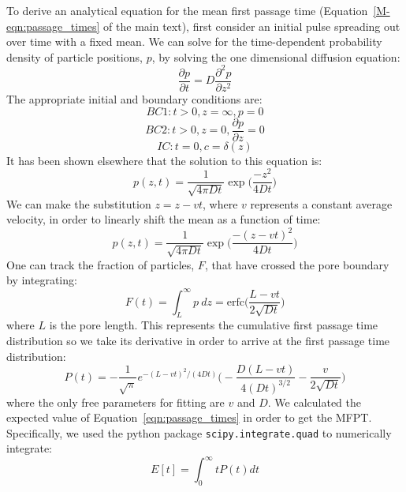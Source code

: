 \documentclass{article}
\begin{document}
  To derive an analytical equation for the mean first passage time 
  (Equation~\ref{M-eqn:passage_times} of the main text), first consider an 
  initial pulse spreading out over time with a fixed mean. We can solve for the 
  time-dependent probability density of particle positions, $p$, by solving the one
  dimensional diffusion equation:
  \begin{equation}
  \frac{\partial p}{\partial t} = D \frac{\partial^2 p}{\partial z^2}
  \end{equation}
  The appropriate initial and boundary conditions are:
  $$BC1: t > 0, z = \infty, p = 0$$
  $$BC2: t > 0, z = 0, \frac{\partial p}{\partial z} = 0$$
  $$IC: t = 0, c = \delta(z)$$ %
  It has been shown 
  elsewhere that the solution to this equation is:~\cite{cussler_diffusion:_2009}
  \begin{equation}
  p(z, t) = \frac{1}{\sqrt{4 \pi D t}}\exp\bigg(\frac{-z^2}{4Dt}\bigg)
  \end{equation}
  We can make the substitution $z = z - vt$, where $v$ represents a constant average
  velocity, in order to linearly shift the mean as a function of time:
  \begin{equation}
  p(z, t) = \frac{1}{\sqrt{4 \pi D t}}\exp\bigg(\frac{-(z - vt)^2}{4Dt}\bigg)
  \end{equation}
  One can track the fraction of particles, $F$, that have crossed the pore 
  boundary by integrating:
  \begin{equation}
  F(t) = \int_L^\infty p~dz = \mathrm{erfc}\bigg(\frac{L - vt}{2\sqrt{D t}}\bigg)
  \end{equation}
  where $L$ is the pore length. This represents the cumulative first passage 
  time distribution so we take its derivative in order to arrive at the first
  passage time distribution:
  \begin{equation}
  P(t) = -\frac{1}{\sqrt{\pi}}e^{-(L - vt)^2 / (4Dt)}\bigg(-\frac{D(L - vt)}{4(Dt)^{3/2}} - \frac{v}{2\sqrt{Dt}}\bigg)
  \label{eqn:passage_times}
  \end{equation} 
  where the only free parameters for fitting are $v$ and $D$. We calculated the
  expected value of Equation~\ref{eqn:passage_times} in order to get the MFPT. Specifically,
  we used the python package \texttt{scipy.integrate.quad} to numerically integrate:
  \begin{equation}
  E[t] = \int_0^\infty tP(t) dt
  \end{equation}
  
\end{document}

